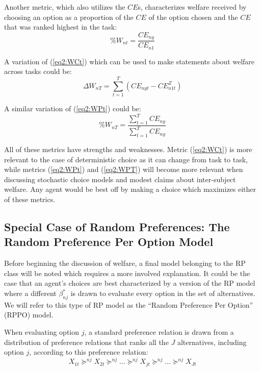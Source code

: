 \documentclass[11pt,a4paper]{report}
\newcommand\CE{\ensuremath{\mathit{CE}}}    %
\begin{document}
Another metric, which also utilizes the {\CE}s, characterizes welfare received by choosing an option as a proportion of the {\CE} of the option chosen and the {\CE} that was ranked highest in the task:
\begin{equation}
	\label{eq2:WPt}
	\%W_{nt} = \frac{ {\CE}_{ny} }{ {\CE}_{n1} }
\end{equation}

\noindent A variation of (\ref{eq2:WCt}) which can be used to make statements about welfare across tasks could be:
\begin{equation}
	\label{eq2:WCT}
	\Delta W_{nT} = \sum_{t=1}^T \left( {\CE}_{nyt} - {\CE}_{n1t}^Z \right)
\end{equation}

\noindent A similar variation of (\ref{eq2:WPt}) could be:
\begin{equation}
	\label{eq2:WPT}
	\%W_{nT} = \frac{\displaystyle\sum_{t=1}^{T} {\CE}_{ny} }{\displaystyle\sum_{t=1}^{T} {\CE}_{ny}}
\end{equation}

All of these metrics have strengths and weaknesses.
Metric (\ref{eq2:WCt}) is more relevant to the case of deterministic choice as it can change from task to task, while metrics (\ref{eq2:WPt}) and (\ref{eq2:WPT}) will become more relevant when discussing stochastic choice models and modest claims about inter-subject welfare.
Any agent would be best off by making a choice which maximizes either of these metrics.

\subsection{Special Case of Random Preferences: The Random Preference Per Option Model}

Before beginning the discussion of welfare, a final model belonging to the RP class will be noted which requires a more involved explanation.
It could be the case that an agent's choices are best characterized by a version of the RP model where a different $\beta^*_{nj}$ is drawn to evaluate every option in the set of alternatives.
We will refer to this type of RP model as the \enquote{Random Preference Per Option} (RPPO) model.

When evaluating option $j$, a standard preference relation is drawn from a distribution of preference relations that ranks all the $J$ alternatives, including option $j$, according to this preference relation:
\begin{equation}
	\label{eq2:RPPO.jorank}
	X_{1t} \succcurlyeq^{nj} X_{2t} \succcurlyeq^{nj} \ldots \succcurlyeq^{nj} X_{jt} \succcurlyeq^{nj} \ldots \succcurlyeq^{nj} X_{Jt}
\end{equation}
\end{document}
